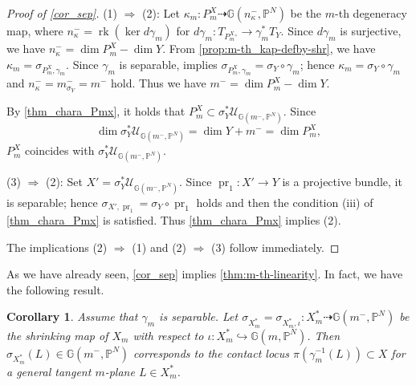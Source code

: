 \documentclass[a4paper,12pt]{amsart}
\theoremstyle{plain}
\newtheorem{cor}[cor]{Corollary}
\theoremstyle{definition}
\begin{document}
\begin{proof}[Proof of \autoref{cor_sep}]
  (1) $\Rightarrow$ (2):  
  Let $\kappa_m: P_m^X \dashrightarrow {\mathbb {G}}(n^-_{\kappa}, {\mathbb{P}}^N)$
  be the $m$-th degeneracy map,
  where $n^-_{\kappa} =\operatorname{rk} ( \ker d \gamma_m )  $ for $d \gamma_m : T_{{P_m^{X}}{^\circ}} {\rightarrow} \gamma_m^* T_Y$.
  Since $d \gamma_m$ is surjective,
  we have $n^-_{\kappa} = \dim {P_m^{X}}- \dim Y$.
  From \autoref{prop:m-th_kap-defby-shr}, we have
  $\kappa_m = \sigma_{P_m^X,\gamma_m}$.
  Since $\gamma_m$ is separable, \cite[Remark 2.3]{FI} implies
  $\sigma_{P_m^X,\gamma_m} =\sigma_Y \circ  \gamma_m$; hence
  $\kappa_m = \sigma_Y \circ  \gamma_m$ and $n^-_{\kappa} = m^{-}_{\sigma_Y} = m^{-}$ hold.
  Thus we have $m^-=\dim P_m^X- \dim Y$.

  By \autoref{thm_chara_Pmx},
  it holds that $P_m^X \subset \sigma_Y^{*} {\mathcal {U}}_{{\mathbb {G}}(m^-,{\mathbb{P}}^N)}$.
  Since 
  \[
  \dim \sigma_Y^{*} {\mathcal {U}}_{{\mathbb {G}}(m^-,{\mathbb{P}}^N)} = \dim Y + m^- = \dim P_m^X,
  \]
  $P_m^X$ coincides with $\sigma_Y^{*} {\mathcal {U}}_{{\mathbb {G}}(m^-,{\mathbb{P}}^N)}$.

  (3) $ \Rightarrow$ (2):
  Set $X' = \sigma_Y^{*} {\mathcal {U}}_{{\mathbb {G}}(m^-,{\mathbb{P}}^N)}$.
  Since $\operatorname{pr}_1 : X' {\rightarrow} Y$ is a projective bundle,
  it is separable;
  hence $\sigma_{X',\operatorname{pr}_1} =\sigma_Y \circ \operatorname{pr}_1$ holds and then the condition (iii) of \autoref{thm_chara_Pmx} is satisfied.
  Thus \autoref{thm_chara_Pmx} implies (2).

  The implications (2) $\Rightarrow$ (1) and (2) $\Rightarrow$ (3)
  follow immediately.
\end{proof}

As we have already seen,
\autoref{cor_sep} implies \autoref{thm:m-th-linearity}.
In fact, we have the following result.

\begin{cor}\label{thm:sigma_m-eq-cloc}
  Assume that $\gamma_m$ is separable.
  Let $\sigma_{X_{m}^*} = \sigma_{X_{m}^*, \iota}: X_{m}^* \dashrightarrow {\mathbb{G}}(m^{-}, {{\mathbb{P}}^N})$
  be the shrinking map of $X_m$ with respect to $\iota: X_{m}^* \hookrightarrow {{\mathbb{G}}(m,{{\mathbb{P}}^N})}$.
  Then $\sigma_{X_{m}^*}(L) \in {\mathbb{G}}(m^{-}, {{\mathbb{P}}^N})$
  corresponds to the contact locus $\pi(\gamma_m^{-1}(L)) \subset X$
  for a general tangent $m$-plane $L \in X_m^*$.
\end{cor}
\end{document}

